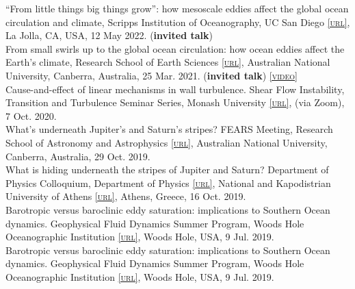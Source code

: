 \documentclass[10pt, letter]{article}
\def\www{http://www.navidconstantinou.com}
\newcommand{\html}[1]{\href{#1}{\scriptsize\textsc{[url]}}}
\newcommand{\years}[1]{\marginnote{\scriptsize #1}}
\begin{document}
\years{2022} “From little things big things grow”: how mesoscale eddies affect the global ocean circulation and climate, Scripps Institution of Oceanography, UC San Diego \html{https://scripps.ucsd.edu/}, La Jolla, CA, USA, 12 May 2022. (\textbf{invited talk}) \\[.2cm]
\years{2021} From small swirls up to the global ocean circulation: how ocean eddies affect the Earth’s climate, Research School of Earth Sciences \html{https://earthsciences.anu.edu.au/}, Australian National University, Canberra, Australia, 25 Mar. 2021. (\textbf{invited talk}) \href{\www/presentations/RSES-EddiesClimate_Mar2021.pdf}{{}} \href{https://www.youtube.com/watch?v=PPz8bD-vJmI&list=PLyZME1ti5Gk3RzPpheCQmtA7XUlqNT7LY&index=25}{\scriptsize\textsc{[video]}}\\[.2cm]
\years{2020} Cause-and-effect of linear mechanisms in wall turbulence. Shear Flow Instability, Transition and Turbulence Seminar Series, Monash University \html{https://www.monash.edu}, (via Zoom), 7 Oct. 2020.  \href{\www/presentations/Monash-ShearTurbulence-Oct2020.pdf}{{}}\\[.2cm]
What's underneath Jupiter's and Saturn's stripes? FEARS Meeting, Research School of Astronomy and Astrophysics \html{http://rsaa.anu.edu.au/}, Australian National University, Canberra, Australia, 29 Oct. 2019. \href{\www/presentations/RSAA-MagneticViscosity_Oct2019.pdf}{{}}\\[.2cm]
What is hiding underneath the stripes of Jupiter and Saturn? Department of Physics Colloquium, Department of Physics \html{http://en.phys.uoa.gr/}, National and Kapodistrian University of Athens \html{http://en.uoa.gr/}, Athens, Greece, 16 Oct. 2019. \href{\www/presentations/UoA-MagneticViscosity_Oct2019.pdf}{{}}\\[.2cm]
Barotropic versus baroclinic eddy saturation: implications to Southern Ocean dynamics. Geophysical Fluid Dynamics Summer Program, Woods Hole Oceanographic Institution \html{https://www.whoi.edu/gfd}, Woods Hole, USA, 9 Jul. 2019. \href{\www/presentations/EddySaturation-GFD-2019.pdf}{{}}\\[.2cm]
Barotropic versus baroclinic eddy saturation: implications to Southern Ocean dynamics. Geophysical Fluid Dynamics Summer Program, Woods Hole Oceanographic Institution \html{https://www.whoi.edu/gfd}, Woods Hole, USA, 9 Jul. 2019. \href{\www/presentations/EddySaturation-GFD-2019.pdf}{{}}\\[.2cm]
\end{document}
